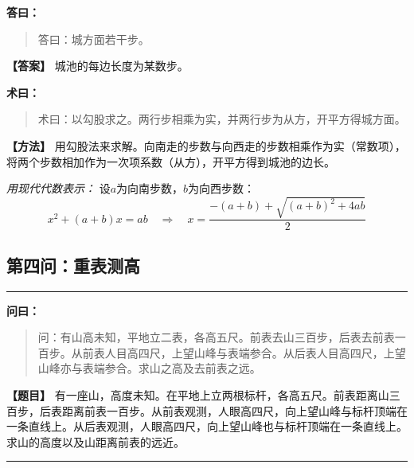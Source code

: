 \documentclass[11pt,a4paper]{article}
\newenvironment{mathproblem}[1][]{%
  \medskip\noindent\rule{\textwidth}{0.4pt}%
  \par\noindent{\Large\bfseries\color{sectioncolor}#1}\par\nopagebreak%
  \smallskip%
}{%
  \par\noindent\rule{\textwidth}{0.4pt}\medskip%
}
\newcommand{\wenlabel}{\textbf{\color{origcolor}问曰：}}
\newcommand{\dalabel}{\textbf{\color{origcolor}答曰：}}
\newcommand{\shulabel}{\textbf{\color{origcolor}术曰：}}
\newcommand{\modwenlabel}{\textbf{\color{modcolor}【题目】}}
\newcommand{\moddalabel}{\textbf{\color{modcolor}【答案】}}
\newcommand{\modshulabel}{\textbf{\color{modcolor}【方法】}}
\begin{document}
\begin{originaltext}
\dalabel
\begin{quote}
\textcolor{origcolor}{%
答曰：城方面若干步。
}
\end{quote}
\end{originaltext}

\begin{moderntext}
\moddalabel
城池的每边长度为某数步。
\end{moderntext}

\begin{originaltext}
\shulabel
\begin{quote}
\textcolor{origcolor}{%
术曰：以勾股求之。两行步相乘为实，并两行步为从方，开平方得城方面。
}
\end{quote}
\end{originaltext}

\begin{moderntext}
\modshulabel
用勾股法来求解。向南走的步数与向西走的步数相乘作为实（常数项），将两个步数相加作为一次项系数（从方），开平方得到城池的边长。

\textit{用现代代数表示：} 设$a$为向南步数，$b$为向西步数：
\[
x^2 + (a+b)x = ab \quad\Rightarrow\quad x = \frac{-(a+b) + \sqrt{(a+b)^2 + 4ab}}{2}
\]
\end{moderntext}

\subsection*{第四问：重表测高}

\begin{mathproblem}[\textbf{第四问：重表测高}]

\begin{originaltext}
\wenlabel
\begin{quote}
\textcolor{origcolor}{%
问：有山高未知，平地立二表，各高五尺。前表去山三百步，后表去前表一百步。从前表人目高四尺，上望山峰与表端参合。从后表人目高四尺，上望山峰亦与表端参合。求山之高及去前表之远。
}
\end{quote}
\end{originaltext}

\begin{moderntext}
\modwenlabel
有一座山，高度未知。在平地上立两根标杆，各高五尺。前表距离山三百步，后表距离前表一百步。从前表观测，人眼高四尺，向上望山峰与标杆顶端在一条直线上。从后表观测，人眼高四尺，向上望山峰也与标杆顶端在一条直线上。求山的高度以及山距离前表的远近。
\end{moderntext}

\end{mathproblem}
\end{document}
